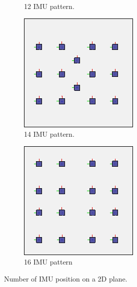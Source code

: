 \begin{figure}[h!]
\begin{subfigure}[b]{0.2\linewidth}
    \caption{12 IMU pattern.}
  \end{subfigure}
  \begin{subfigure}[b]{0.2\linewidth}
    \includegraphics[width=\linewidth]{figures/IMU14.png}
    \caption{14 IMU pattern.}
  \end{subfigure}
  \begin{subfigure}[b]{0.2\linewidth}
    \includegraphics[width=\linewidth]{figures/IMU16.png}
    \caption{16 IMU pattern}
  \end{subfigure}

  \caption{Number of IMU position on a 2D plane.}
  \label{fig:IMU_pattern}
\end{figure}



